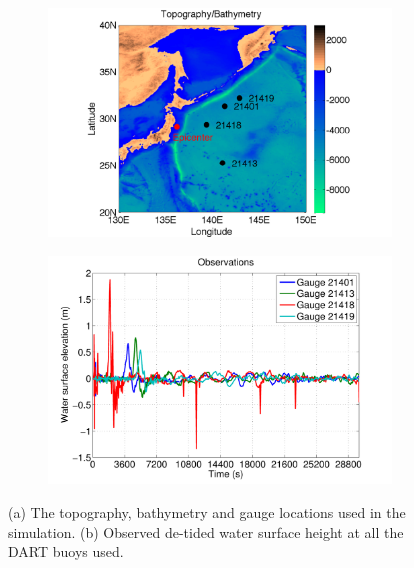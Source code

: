 \documentclass[review,12pt]{elsarticle}
\begin{document}
\begin{figure}[ht]
\centering
\begin{subfigure}[c]{0.45\textwidth}
    \includegraphics[width=\textwidth]{Figure2a.pdf}
    \caption{} \label{fig:setup_buoy_locations}
\end{subfigure}
\begin{subfigure}[c]{0.45\textwidth}
    \includegraphics[width=\textwidth]{Figure2b.pdf} 
    \caption{} \label{fig:setup_buoy_data}
\end{subfigure}
\caption{(a) The topography, bathymetry and gauge locations used in the simulation. (b) Observed de-tided water surface height at all the DART buoys used.}
\label{fig:setup}
\end{figure}
\end{document}
